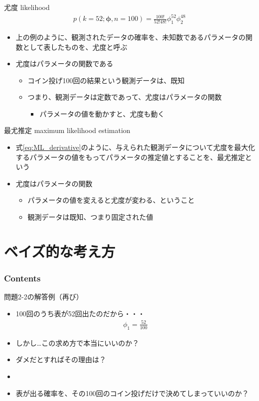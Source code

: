 \documentclass[aspectratio=169,unicode,dvipdfmx,14pt]{beamer}
\begin{document}
\begin{frame}{尤度 likelihood}
\vspace{-.3in}
\begin{align}
p(k=52;\bm{\phi},n=100)=\frac{100!}{52!48!}\phi_1^{52}\phi_2^{48}
\end{align}
\begin{itemize}
\vspace{-.3in}
\item 上の例のように、観測されたデータの確率を、未知数であるパラメータの関数として表したものを、尤度と呼ぶ
\item 尤度はパラメータの関数である
\begin{itemize}
\item コイン投げ100回の結果という観測データは、既知
\item つまり、観測データは定数であって、尤度はパラメータの関数
\begin{itemize}
\item パラメータの値を動かすと、尤度も動く
\end{itemize}
\end{itemize}
\end{itemize}
\end{frame}

\begin{frame}{最尤推定 maximum likelihood estimation}
\begin{itemize}
\item 式\eqref{eq:ML_derivative}のように、与えられた観測データについて尤度を最大化するパラメータの値をもってパラメータの推定値とすることを、最尤推定という
\item 尤度はパラメータの関数
\begin{itemize}
\item パラメータの値を変えると尤度が変わる、ということ
\item 観測データは既知、つまり固定された値
\end{itemize}
\end{itemize}
\end{frame}

\section{ベイズ的な考え方}

\begin{frame}\frametitle{Contents}
\Large \tableofcontents[currentsection]
\end{frame}

\begin{frame}{問題2-2の解答例（再び）}
\begin{itemize}
\item 100回のうち表が52回出たのだから・・・
\begin{align}
\phi_1 = \frac{52}{100}
\end{align}
\item しかし…この求め方で本当にいいのか？
\item ダメだとすればその理由は？
\item[] \
\item 表が出る確率を、その100回のコイン投げだけで決めてしまっていいのか？
\end{itemize}
\end{frame}
\end{document}
